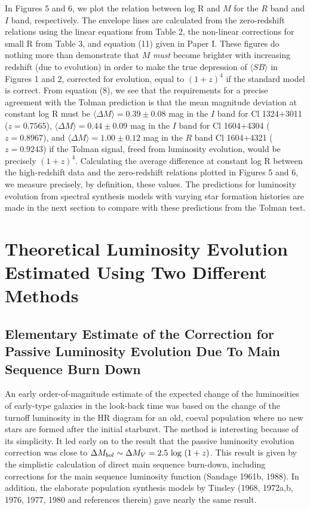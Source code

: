 \documentclass[preprint]{aastex}
\begin{document}
In Figures 5 and 6, we plot the relation between log R and $M$ for the
$R$ band and $I$ band, respectively. The envelope lines are calculated
from the zero-redshift relations using the linear equations from Table
2, the non-linear corrections for small R from Table 3, and equation
(11) given in Paper I.  These figures do nothing more than demonstrate
that $M$ {\it must} become brighter with increasing redshift (due to
evolution) in order to make the true depression of $\langle SB
\rangle$ in Figures 1 and 2, corrected for evolution, equal to
$(1+z)^4$ if the standard model is correct.  From equation (8), we see
that the requirements for a precise agreement with the Tolman
prediction is that the mean magnitude deviation at constant log R must
be $\langle \Delta M \rangle = 0.39 \pm 0.08$ mag in the $I$ band for
Cl 1324+3011 ($z = 0.7565$), $\langle \Delta M \rangle = 0.44 \pm
0.09$ mag in the $I$ band for Cl 1604+4304 ($z = 0.8967$), and
$\langle \Delta M \rangle = 1.00 \pm 0.12$ mag in the $R$ band Cl
1604+4321 ($z = 0.9243$) if the Tolman signal, freed from luminosity
evolution, would be precisely $(1+z)^4$.  Calculating the average
difference at constant log R between the high-redshift data and the
zero-redshift relations plotted in Figures 5 and 6, we measure
precisely, by definition, these values.  The predictions for
luminosity evolution from spectral synthesis models with varying star
formation histories are made in the next section to compare with these
predictions from the Tolman test.

\section{Theoretical Luminosity Evolution Estimated Using Two Different
Methods}

\subsection{Elementary Estimate of the Correction for Passive Luminosity 
Evolution Due To Main Sequence Burn Down}

An early order-of-magnitude estimate of the expected change of the
luminosities of early-type galaxies in the look-back time was based on
the change of the turnoff luminosity in the HR diagram for an old,
coeval population where no new stars are formed after the initial
starburst. The method is interesting because of its simplicity.  It
led early on to the result that the passive luminosity evolution
correction was close to $\Delta M_{bol} \sim \Delta M_V = 2.5~{\rm
log}~(1 + z)$.  This result is given by the simplistic calculation of
direct main sequence burn-down, including corrections for the main
sequence luminosity function (Sandage 1961b, 1988). In addition, the
elaborate population synthesis models by Tinsley (1968, 1972a,b, 1976,
1977, 1980 and references therein) gave nearly the same result.
\end{document}
